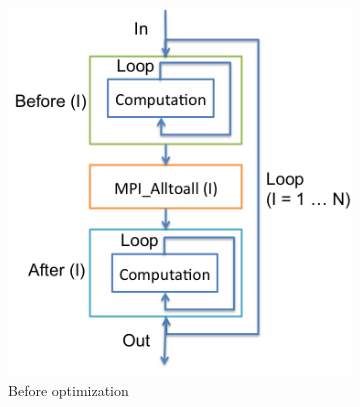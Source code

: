 \begin{figure}
  \centering
  \begin{subfigure}[b]{0.25\textwidth}
    \includegraphics[width=1\textwidth]{fig/ft_loop.png}
    \caption{Before optimization}
    \label{fig:ft_loop}
  \end{subfigure}%
  \begin{subfigure}[b]{0.232\textwidth}

\end{subfigure}
\end{figure}
